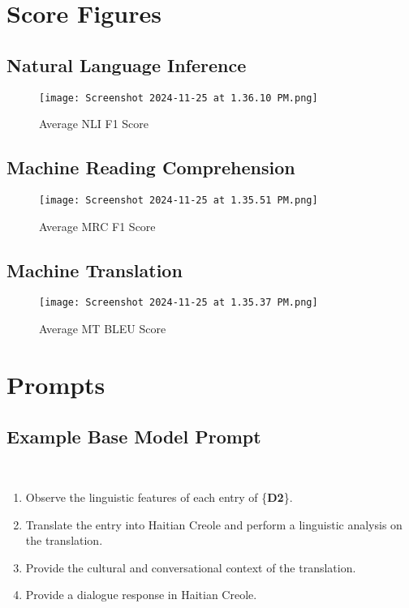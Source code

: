 \section{Score Figures}
\label{sec:appendix}

\subsection{Natural Language Inference}

\begin{figure}[H]
    \centering
    \texttt{[image: Screenshot 2024-11-25 at 1.36.10 PM.png]}
    \caption{Average NLI F1 Score}
    \label{fig:nli-scores}
\end{figure}

\subsection{Machine Reading Comprehension}

\begin{figure}[H]
    \centering
    \texttt{[image: Screenshot 2024-11-25 at 1.35.51 PM.png]}
    \caption{Average MRC F1 Score}
    \label{fig:mrc-scores}
\end{figure}

\subsection{Machine Translation}

\begin{figure}[H]
    \centering
    \texttt{[image: Screenshot 2024-11-25 at 1.35.37 PM.png]}
    \caption{Average MT BLEU Score}
    \label{fig:mt-scores}
\end{figure}

\section{Prompts}

\subsection{Example Base Model Prompt}\\

\begin{enumerate}
    \item Observe the linguistic features of each entry of \{\textbf{D2}\}.
    \item Translate the entry into Haitian Creole and perform a linguistic analysis on the translation.
    \item Provide the cultural and conversational context of the translation.
    \item Provide a dialogue response in Haitian Creole.
\end{enumerate}\\

